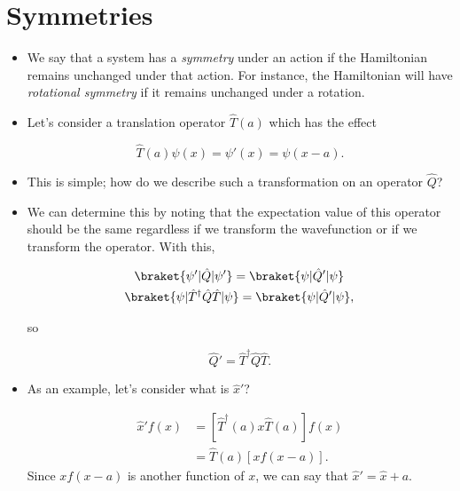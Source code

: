 \section{Symmetries}

\begin{itemize}
  
\item We say that a system has a \textit{symmetry} under an action if the Hamiltonian remains unchanged under that action. For instance, the Hamiltonian will have \textit{rotational symmetry} if it remains unchanged under a rotation.
\item Let's consider a translation operator $\hat{T}(a)$ which has the effect

  \begin{equation}
    \hat{T}(a)\psi(x) = \psi'(x) = \psi(x-a).
  \end{equation}

\item This is simple; how do we describe such a transformation on an operator $\hat{Q}$?
\item We can determine this by noting that the expectation value of this operator should be the same regardless if we transform the wavefunction or if we transform the operator. With this,

  \begin{gather}
    \braket{\psi' | \hat{Q} | \psi'} = \braket{\psi | \hat{Q}' | \psi} \\
    \braket{\psi | \hat{T}^\dagger\hat{Q}\hat{T} | \psi} = \braket{\psi | \hat{Q}' | \psi},
  \end{gather}

  so

  \begin{equation}
    \boxed{\hat{Q}' = \hat{T}^\dagger\hat{Q}\hat{T}.}
  \end{equation}

\item As an example, let's consider what is $\hat{x}'$?

  \begin{align}
    \hat{x}'f(x) &= [\hat{T}^\dagger(a) x \hat{T}(a)]f(x) \\
                 &= \hat{T}(a)[xf(x-a)].
  \end{align}
  Since $xf(x-a)$ is another function of $x$, we can say that $\hat{x}' = \hat{x} + a$.
  
\end{itemize}


